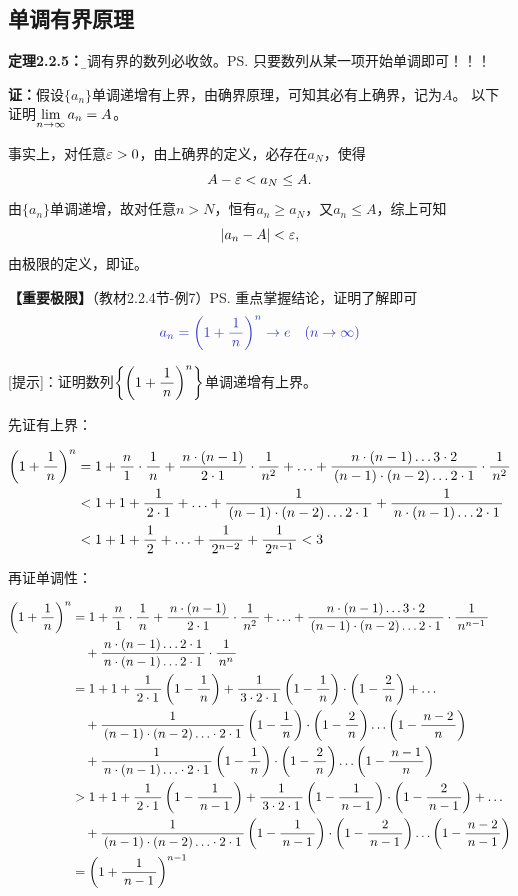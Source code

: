 \subsection{单调有界原理}

{\bf 定理2.2.5：}{\b 单调有界的数列必收敛。}\ps{只要数列从某一项开始单调即可！！！}

{\bf 证：}假设$\{a_n\}$单调递增有上界，由确界原理，可知其必有上确界，记为$A$。
以下证明$\limn a_n=A$。

事实上，对任意$\e>0$，由上确界的定义，必存在$a_N$，使得
$$A-\e<a_N\leq A.$$
由$\{a_n\}$单调递增，故对任意$n>N$，恒有$a_n\geq a_N$，又$a_n\leq A$，综上可知
$$|a_n-A|<\e,$$
由极限的定义，即证。


{\bf 【重要极限】}（教材2.2.4节-例7）\ps{重点掌握结论，证明了解即可}
$${\b a_n=\left(1+\df{1}{n}\right)^n\to e\quad (n\to\infty)}$$

[提示]：证明数列$\left\{\left(1+\df1n\right)^n\right\}$单调递增有上界。

先证有上界：

\begin{align}
	\left(1+\df1n\right)^n&=1+\df n1\cdot\df1n
	+\df{n\cdot(n-1)}{2\cdot1}\cdot\df1{n^2}+\ldots
	+\df{n\cdot(n-1)\ldots3\cdot2}{(n-1)\cdot(n-2)\ldots2\cdot1}\cdot\df1{n^2}\notag\\
	&<1+1+\df1{2\cdot1}+\ldots+\df1{(n-1)\cdot(n-2)\ldots2\cdot1}
	+\df1{n\cdot(n-1)\ldots2\cdot1}\notag\\
	&<1+1+\df12+\ldots+\df1{2^{n-2}}+\df1{2^{n-1}}<3\notag
\end{align}

再证单调性：

\begin{align}
	\left(1+\df1n\right)^n&=1+\df n1\cdot\df1n
	+\df{n\cdot(n-1)}{2\cdot1}\cdot\df1{n^2}+\ldots
	+\df{n\cdot(n-1)\ldots3\cdot2}{(n-1)\cdot(n-2)\ldots2\cdot1}
	\cdot\df1{n^{n-1}}\notag\\
	&\quad +\df{n\cdot(n-1)\ldots2\cdot1}{n\cdot(n-1)\ldots2\cdot1}
	\cdot\df1{n^{n}}\notag\\
	&=1+1+\df1{2\cdot 1}\left(1-\df1n\right)+\df1{3\cdot2\cdot
	1}\left(1-\df1n\right)\cdot\left(1-\df2n\right)+\ldots\notag\\
	&\quad +\df1{(n-1)\cdot(n-2)\ldots\cdot2\cdot
	1}\left(1-\df1n\right)\cdot\left(1-\df2n\right)
	\ldots\left(1-\df{n-2}n\right)\notag\\
	&\quad +\df1{n\cdot (n-1)\ldots\cdot2\cdot
	1}\left(1-\df1n\right)\cdot\left(1-\df2n\right)
	\ldots\left(1-\df{n-1}n\right)\notag\\
	&>1+1+\df1{2\cdot 1}\left(1-\df1{n-1}\right)+\df1{3\cdot2\cdot
	1}\left(1-\df1{n-1}\right)\cdot\left(1-\df2{n-1}\right)+\ldots\notag\\
	&\quad +\df1{(n-1)\cdot(n-2)\ldots\cdot2\cdot
	1}\left(1-\df1{n-1}\right)\cdot\left(1-\df2{n-1}\right)
	\ldots\left(1-\df{n-2}{n-1}\right)\notag\\
	&=\left(1+\df1{n-1}\right)^{n-1}\notag
\end{align}

